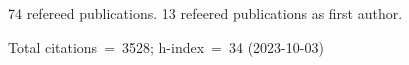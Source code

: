 74 refereed publications. 13 refeered publications as first author.

Total citations~=~3528; h-index~=~34 (2023-10-03)